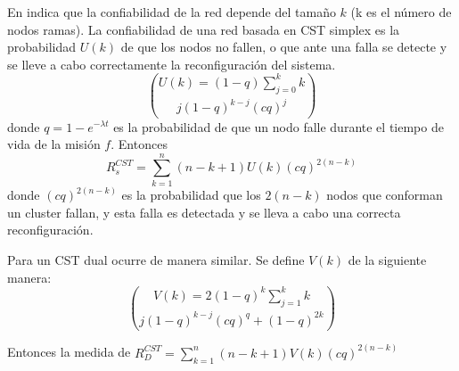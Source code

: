 En \cite{Tai99} indica que la confiabilidad de la red depende del tamaño $k$ (k es el número de nodos ramas). La confiabilidad de una red basada en \ac{CST} simplex es la probabilidad $U(k)$ de que los nodos no fallen, o que ante una falla se detecte y se lleve a cabo correctamente la reconfiguración del sistema. $$U(k) = (1-q) \sum_{j=0}^{k} {k}\choose{j} (1-q)^{k-j} (cq)^j $$ donde $q = 1-e^{-\lambda t}$ es la probabilidad de que un nodo falle durante el tiempo de vida de la misión $f$. Entonces $$R_s^{CST} = \sum_{k=1}^n (n-k+1)U(k)(cq)^{2(n-k)}$$ donde $(cq)^{2(n-k)}$ es la probabilidad que los  $2(n-k)$ nodos que conforman un cluster fallan, y esta falla es detectada y se lleva a cabo una correcta reconfiguración.

Para un \ac{CST} dual ocurre de manera similar. Se define $V(k)$ de la siguiente manera: $$V(k) = 2(1-q)^k \sum_{j=1}^k {k}\choose{j} (1-q)^{k-j} (cq)^q + (1-q)^{2k}$$

Entonces la medida de $R_D^{CST} =  \sum_{k=1}^n (n-k+1) V(k) (cq)^{2(n-k)}$
